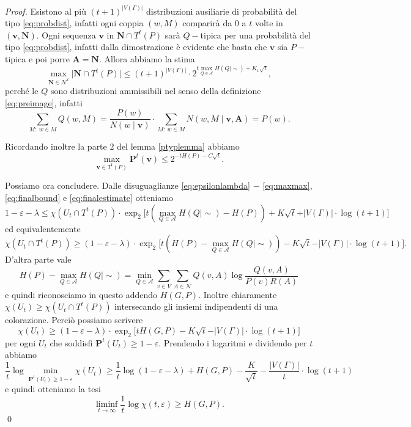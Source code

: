 \begin{proof}
	Esistono al più \((t+1)^{\vert V(\Gamma)\vert}\) distribuzioni ausiliarie di probabilità del tipo \eqref{eq:probdist}, infatti ogni coppia \((w,M)\) comparirà da \(0\) a \(t\) volte in \((\mathbf{v},\mathbf{N})\). Ogni sequenza \(\mathbf{v}\) in \(\mathbf{N}\cap T^{t}(P)\) sarà \(Q-\)tipica per una probabilità del tipo \eqref{eq:probdist}, infatti dalla dimostrazione è evidente che basta che \(\mathbf{v}\) sia \(P-\)tipica e poi porre \(\mathbf{A}=\mathbf{N}\). Allora abbiamo la stima 
	\begin{equation}
		\label{eq:finalbound} \max_{\mathbf{N}\in \mathcal{N}^t} \big\vert \mathbf{N}\cap T^{t}(P) \big\vert \le (t+1)^{\vert V(\Gamma)\vert} \cdot 2^{t\max_{Q\in \mathcal{A}} H(Q\mid\sim)+K_1\sqrt{t}}, 
	\end{equation}
	perché le \(Q\) sono distribuzioni ammissibili nel senso della definizione \eqref{eq:preimage}, infatti
	\[\sum_{M:\ w\in M} Q(w, M)=\frac{P(w)}{N(w\mid \mathbf{v})}\cdot \sum_{M:\ w\in M} N(w,M\mid \mathbf{v}, \mathbf{A})=P(w).\]
	
	Ricordando inoltre la parte \(2\) del lemma \ref{ptyplemma} abbiamo 
	\begin{equation}
		\label{eq:finalestimate} \max_{\mathbf{v}\in T^{t}(P)} \mathbf{P}^t(\mathbf{v}) \le 2^{-tH(P)-C\sqrt{t}}. 
	\end{equation}
	
	Possiamo ora concludere. Dalle disuguaglianze \eqref{eq:epsilonlambda} \(-\) \eqref{eq:maxmax}, \eqref{eq:finalbound} e \eqref{eq:finalestimate} otteniamo
	\[1-\varepsilon-\lambda \le \chi(U_{t}\cap T^t(P))\cdot \exp_{2}{\big[t(\max_{Q\in \mathcal{A}} H(Q\mid\sim)-H(P)) + K\sqrt{t}} + \vert V(\Gamma)\vert\cdot\log{(t+1)} \big]\]
	ed equivalentemente
	\[\chi(U_{t}\cap T^t(P))\ge (1-\varepsilon-\lambda)\cdot \exp_{2}{\big[t(H(P)-\max_{Q\in \mathcal{A}} H(Q\mid\sim)) - K\sqrt{t}} - \vert V(\Gamma)\vert\cdot\log{(t+1)} \big].\]
	D'altra parte vale
	\[H(P)-\max_{Q\in \mathcal{A}} H(Q\mid\sim) = \min_{Q\in \mathcal{A}} \sum_{v\in V}\sum_{A\in \mathcal{N}} Q(v,A)\log{\frac{Q(v,A)}{P(v)R(A)}}\]
	e quindi riconosciamo in questo addendo \(H(G,P)\). Inoltre chiaramente \(\chi(U_{t})\ge\chi(U_{t}\cap T^{t}(P))\) intersecando gli insiemi indipendenti di una colorazione. Perciò possiamo scrivere
	\[\chi(U_{t})\ge (1-\varepsilon-\lambda)\cdot \exp_{2}{\big[tH(G,P) - K\sqrt{t}} - \vert V(\Gamma)\vert\cdot\log{(t+1)} \big]\]
	per ogni \(U_{t}\) che soddisfi \(\mathbf{P}^t(U_{t})\ge 1-\varepsilon\). Prendendo i logaritmi e dividendo per \(t\) abbiamo
	\[\frac{1}{t}\log{\min_{\mathbf{P}^t(U_{t})\ge 1-\varepsilon}} \chi(U_{t})\ge \frac{1}{t}\log{(1-\varepsilon-\lambda)} + H(G,P) - \frac{K}{\sqrt{t}} - \frac{\vert V(\Gamma)\vert}{t}\cdot \log{(t+1)}\]
	e quindi otteniamo la tesi
	\[ \liminf_{t\to \infty} \frac{1}{t}\log\chi(t,\varepsilon)\ge H(G,P). \]
	\qed 
\end{proof}
